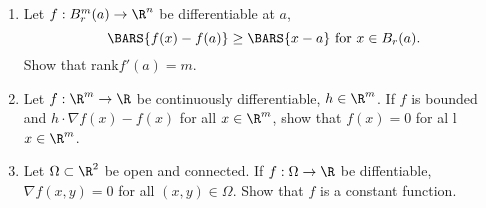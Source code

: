 \documentclass[10pt,a4paper]{report}
\begin{document}
\begin{enumerate}
\item Let $f: B_r^m(a) \to \R^n$ be differentiable at $a$, $$\BARS{f(x)-f(a)}\ge\BARS{x-a}\text{ for }x \in B_r(a).$$ Show that rank$ f'(a)=m$.

\item Let $f: \R^m\to \R$ be continuously differentiable, $h \in \R^m$.  If $f$ is bounded and $h\cdot \nabla f(x) -f(x)$ for all $ x \in \R^m$, show that $f(x) =0$ for al l$x \in \R^m$.

\item Let $\Omega \subset \R^2$ be open and connected.  If $f: \Omega \to \R$ be diffentiable, $\nabla f(x,y)=0$ for all $(x,y) \in \Omega$.  Show that $f$ is a constant function.

\end{enumerate}
\end{document}
